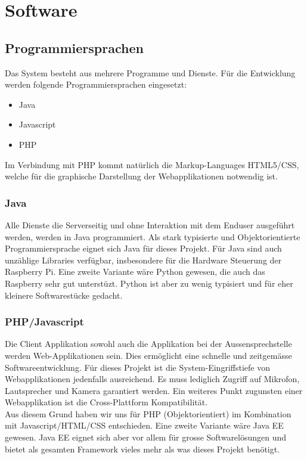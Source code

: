 \section{Software}
\label{sec:chapterexample}

\subsection{Programmiersprachen}
Das System besteht aus mehrere Programme und Dienste. Für die Entwicklung werden folgende Programmiersprachen eingesetzt:
\begin{itemize}
	\item Java
	\item Javascript
	\item PHP
\end{itemize}
Im Verbindung mit PHP kommt natürlich die Markup-Languages HTML5/CSS, welche für die graphische Darstellung der Webapplikationen notwendig ist.

\subsubsection{Java}
\label{kap:java}
Alle Dienste die Serverseitig und ohne Interaktion mit dem Enduser ausgeführt werden, werden in Java programmiert. Als stark typisierte und Objektorientierte Programmiersprache eignet sich Java für dieses Projekt. Für Java sind auch unzählige Libraries verfügbar, insbesondere für die Hardware Steuerung der Raspberry Pi. Eine zweite Variante wäre Python gewesen, die auch das Raspberry sehr gut unterstüzt. Python ist aber zu wenig typisiert und für eher kleinere Softwarestücke gedacht.

\subsubsection{PHP/Javascript}
Die Client Applikation sowohl auch die Applikation bei der Aussensprechstelle werden Web-Applikationen sein. Dies ermöglicht eine schnelle und zeitgemässe Softwareentwicklung. Für dieses Projekt ist die System-Eingriffstiefe von Webapplikationen jedenfalls ausreichend. Es muss lediglich Zugriff auf Mikrofon, Lautsprecher und Kamera garantiert werden. Ein weiteres Punkt zugunsten einer Webapplikation ist die Cross-Plattform Kompatibilität.
\\
Aus diesem Grund haben wir uns für PHP (Objektorientiert) im Kombination mit Javascript/HTML/CSS entschieden. Eine zweite Variante wäre Java EE gewesen. Java EE eignet sich aber vor allem für grosse Softwarelösungen und bietet als gesamten Framework vieles mehr als was dieses Projekt benötigt.
\\
